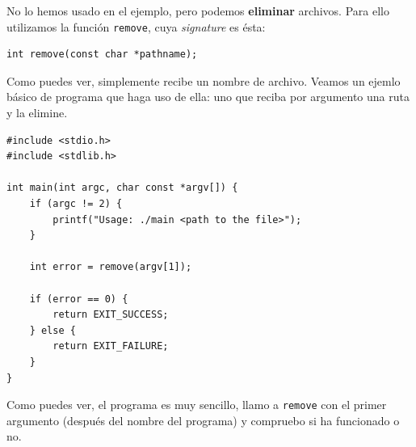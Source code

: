 \documentclass[a4paper]{article}
\begin{document}
No lo hemos usado en el ejemplo, pero podemos \textbf{eliminar} archivos. Para
ello utilizamos la función \verb!remove!, cuya \textit{signature} es ésta:

\noindent
\begin{minipage}[H]{\linewidth}
\mbox{}
\begin{lstlisting}[style=C,
caption={Declaración de la función \texttt{remove}},
label={lst:signatureRemove}]
int remove(const char *pathname);
\end{lstlisting}
\end{minipage}

Como puedes ver, simplemente recibe un nombre de archivo. Veamos un ejemlo
básico de programa que haga uso de ella: uno que reciba por argumento una ruta
y la elimine.

\noindent
\begin{minipage}[H]{\linewidth}
\mbox{}
\begin{lstlisting}[style=C,
caption={Ejemplo de programa que usa la función \texttt{remove}},
label={lst:exampleRemove}]
#include <stdio.h>
#include <stdlib.h>

int main(int argc, char const *argv[]) {
    if (argc != 2) {
        printf("Usage: ./main <path to the file>");
    }

    int error = remove(argv[1]);

    if (error == 0) {
        return EXIT_SUCCESS;
    } else {
        return EXIT_FAILURE;
    }
}
\end{lstlisting}
\end{minipage}

Como puedes ver, el programa es muy sencillo, llamo a \verb!remove! con el
primer argumento (después del nombre del programa) y compruebo si ha funcionado
o no.
\end{document}
